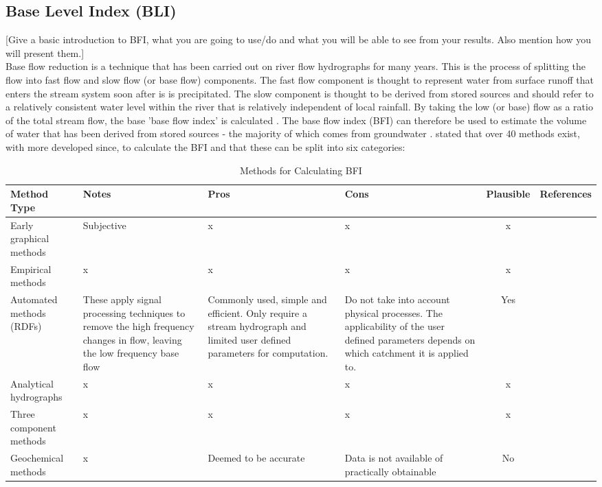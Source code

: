 \documentclass[DIV=calc, paper=a4, fontsize=11pt, twocolumn]{scrartcl}	 %
\begin{document}
	\subsection*{Base Level Index (BLI)}
[Give a basic introduction to BFI, what you are going to use/do and what you will be able to see from your results. Also mention how you will present them.]\\

Base flow reduction is a technique that has been carried out on river flow hydrographs for many years. This is the process of splitting the flow into fast flow and slow flow (or base flow) components. The fast flow component is thought to represent water from surface runoff that enters the stream system soon after is is precipitated. The slow component is thought to be derived from stored sources and should refer to a relatively consistent water level within the river that is relatively independent of local rainfall. By taking the low (or base) flow as a ratio of the total stream flow, the base 'base flow index' is calculated \citep{Gustard1992}. The base flow index (BFI) can therefore be used to estimate the volume of water that has been derived from stored sources - the majority of which comes from groundwater \citep{Li2013}. \citet{Nejadhashemi2009} stated that over 40 methods exist, with more developed since, to calculate the BFI and that these can be split into six categories:

\begin{table*}
\caption{Methods for Calculating BFI}
\centering
\begin{tabularx}{\linewidth}{ l X X X c c}
		\toprule
		Method Type & Notes & Pros & Cons & Plausible & References\\
		\midrule
		Early graphical methods & Subjective &x & x&x  &\\
		Empirical methods &x  &x & x&x &\\
		Automated methods (RDFs) & These apply signal processing techniques to remove the high frequency changes in flow, leaving the low frequency base flow & Commonly used, simple and efficient. Only require a stream hydrograph and limited user defined parameters for computation. & Do not take into account physical processes. The applicability of the user defined parameters depends on which catchment it is applied to. & Yes & \citet{Li2013} \\
		Analytical hydrographs & x &x &x &x & \\
		Three component methods &x  &x & x&x & \\
		Geochemical methods & x & Deemed to be accurate & Data is not available of practically obtainable & No & \\
	\bottomrule
\end{tabularx}
\end{table*}
\end{document}
